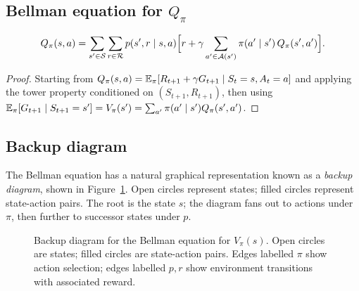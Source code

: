 \subsection*{Bellman equation for $Q_\pi$}

\begin{proposition}
\label{prop:bellman-q}
\begin{equation}
\label{eq:bellman-q}
Q_\pi(s, a)
= \sum_{s' \in \mathcal{S}} \sum_{r \in \mathcal{R}} p(s', r \mid s, a)
  \Bigl[r + \gamma \sum_{a' \in \mathcal{A}(s')} \pi(a' \mid s')\, Q_\pi(s', a')\Bigr].
\end{equation}
\end{proposition}

\begin{proof}
Starting from $Q_\pi(s,a) = \operatorname{\mathbb{E}}_\pi[R_{t+1} + \gamma G_{t+1} \mid S_t=s, A_t=a]$ and applying the tower property conditioned on $(S_{t+1}, R_{t+1})$, then using $\operatorname{\mathbb{E}}_\pi[G_{t+1} \mid S_{t+1} = s'] = V_\pi(s') = \sum_{a'} \pi(a' \mid s') Q_\pi(s', a')$.
\end{proof}

\subsection*{Backup diagram}

The Bellman equation has a natural graphical representation known as a \emph{backup diagram}, shown in Figure~\ref{fig:backup-v}. Open circles represent states; filled circles represent state-action pairs. The root is the state $s$; the diagram fans out to actions under $\pi$, then further to successor states under $p$.

\begin{figure}[ht]
\centering
{}
\caption{Backup diagram for the Bellman equation for $V_\pi(s)$. Open circles are states; filled circles are state-action pairs. Edges labelled $\pi$ show action selection; edges labelled $p,r$ show environment transitions with associated reward.}
\label{fig:backup-v}
\end{figure}

